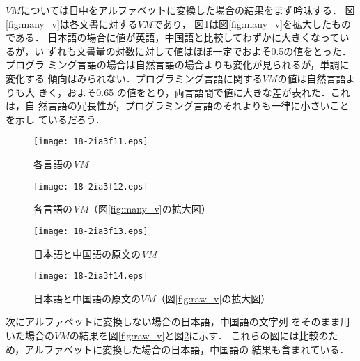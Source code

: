 \documentclass[japanese]{jnlp_JS2.0}
\begin{document}
$\mathit{VM}$については日中をアルファベットに変換した場合の結果をまず吟味する．
図\ref{fig:many_v}は各文書に対する$\mathit{VM}$であり，
図\ref{fig:many_v2}は図\ref{fig:many_v}を拡大したものである．
日本語の場合に値が英語，中国語と比較してわずかに大きくなっているが，い
ずれも文書量の対数に対して値はほぼ一定でおよそ0.5の値をとった．プログラ
ミング言語の場合は自然言語の場合よりも変化が見られるが，単調に変化する
傾向はみられない．プログラミング言語に関する$\mathit{VM}$の値は自然言語よりも大
きく，およそ0.65 の値をとり，両言語間で値に大きな差が表れた．これは，自
然言語の冗長性が，プログラミング言語のそれよりも一律に小さいことを示し
ているだろう．

\begin{figure}[b]
\noindent
 \begin{minipage}{0.5\textwidth}
  \begin{center}
   \texttt{[image: 18-2ia3f11.eps]}
  \end{center}
  \caption{各言語の{\it VM}}
  \label{fig:many_v}
 \end{minipage}
 \begin{minipage}{0.5\textwidth}
  \begin{center}
   \texttt{[image: 18-2ia3f12.eps]}
  \end{center}
  \caption{各言語の{\it VM}（図\ref{fig:many_v}の拡大図）}
  \label{fig:many_v2}
 \end{minipage}
\end{figure}
\begin{figure}[b]
\noindent
  \begin{minipage}{0.5\textwidth}
  \begin{center}
   \texttt{[image: 18-2ia3f13.eps]}
  \end{center}
  \caption{日本語と中国語の原文の{\it VM}}
 \label{fig:raw_v}
 \end{minipage}
 \begin{minipage}{0.5\textwidth}
  \begin{center}
   \texttt{[image: 18-2ia3f14.eps]}
  \end{center}
  \caption{日本語と中国語の原文の$\mathit{VM}$（図\ref{fig:raw_v}の拡大図）}
 \label{fig:raw_v2}
 \end{minipage}
\end{figure}

次にアルファベットに変換しない場合の日本語，中国語の文字列
をそのまま用いた場合の$\mathit{VM}$の結果を図\ref{fig:raw_v}と図\ref{fig:raw_v2}に示す．
これらの図には比較のため，アルファベットに変換した場合の日本語，中国語の
結果も含まれている．
\end{document}
